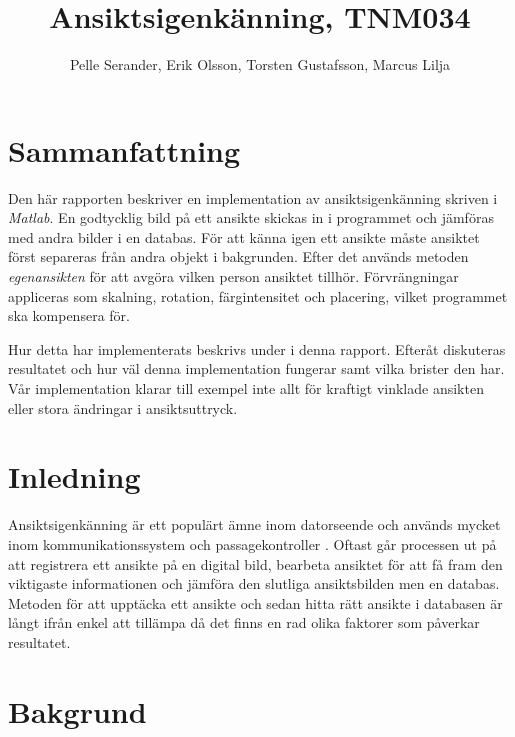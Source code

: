 \documentclass[a4paper,12pt,oneside,final]{extbook}
\title{Ansiktsigenkänning, TNM034}
\author{Pelle Serander, Erik Olsson, Torsten Gustafsson, Marcus Lilja}
\begin{document}
\pagestyle{empty}
\thispagestyle{empty}

\frontmatter

\maketitle

\pagestyle{fancy}

\chapter{Sammanfattning}

Den här rapporten beskriver en implementation av ansiktsigenkänning skriven i \textit{Matlab}. En godtycklig bild på ett ansikte skickas in i programmet och jämföras med andra bilder i en databas. För att känna igen ett ansikte måste ansiktet först separeras från andra objekt i bakgrunden. Efter det används metoden \textit{egenansikten} för att avgöra vilken person ansiktet tillhör. Förvrängningar appliceras som skalning, rotation, färgintensitet och placering, vilket programmet ska kompensera för. 

Hur detta har implementerats beskrivs under  i denna rapport. Efteråt diskuteras resultatet och hur väl denna implementation fungerar samt vilka brister den har. Vår implementation klarar till exempel inte allt för kraftigt vinklade ansikten eller stora ändringar i ansiktsuttryck.

\tableofcontents

\mainmatter

\chapter{Inledning}

Ansiktsigenkänning är ett populärt ämne inom datorseende och används mycket inom kommunikationssystem och passagekontroller \cite{background}. Oftast går processen ut på att registrera ett ansikte på en digital bild, bearbeta ansiktet för att få fram den viktigaste informationen och jämföra den slutliga ansiktsbilden men en databas. Metoden för att upptäcka ett ansikte och sedan hitta rätt ansikte i databasen är långt ifrån enkel att tillämpa då det finns en rad olika faktorer som påverkar resultatet.



\chapter{Bakgrund}
\end{document}
